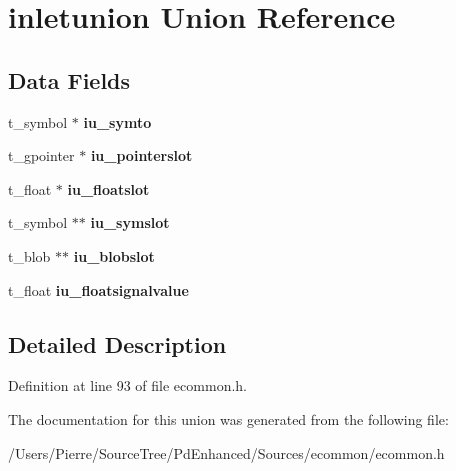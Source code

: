 \hypertarget{unioninletunion}{\section{inletunion Union Reference}
\label{unioninletunion}
}
\subsection*{Data Fields}
\begin{DoxyCompactItemize}
\item 
\hypertarget{unioninletunion_a034ef76c9ac47aad410c151b1a3072ed}{t\-\_\-symbol $\ast$ {\bfseries iu\-\_\-symto}}\label{unioninletunion_a034ef76c9ac47aad410c151b1a3072ed}

\item 
\hypertarget{unioninletunion_a765f6acce4359fbeaebd130279fdd899}{t\-\_\-gpointer $\ast$ {\bfseries iu\-\_\-pointerslot}}\label{unioninletunion_a765f6acce4359fbeaebd130279fdd899}

\item 
\hypertarget{unioninletunion_a4ea31644c26b1c46f9541353b293d3f6}{t\-\_\-float $\ast$ {\bfseries iu\-\_\-floatslot}}\label{unioninletunion_a4ea31644c26b1c46f9541353b293d3f6}

\item 
\hypertarget{unioninletunion_a347eb160d2e6d55719beabdae51a2ac9}{t\-\_\-symbol $\ast$$\ast$ {\bfseries iu\-\_\-symslot}}\label{unioninletunion_a347eb160d2e6d55719beabdae51a2ac9}

\item 
\hypertarget{unioninletunion_aa5bed621c07aa6838a05e81384933715}{t\-\_\-blob $\ast$$\ast$ {\bfseries iu\-\_\-blobslot}}\label{unioninletunion_aa5bed621c07aa6838a05e81384933715}

\item 
\hypertarget{unioninletunion_a4b62c62214438358765fee52d88ac7c5}{t\-\_\-float {\bfseries iu\-\_\-floatsignalvalue}}\label{unioninletunion_a4b62c62214438358765fee52d88ac7c5}

\end{DoxyCompactItemize}


\subsection{Detailed Description}


Definition at line 93 of file ecommon.\-h.



The documentation for this union was generated from the following file\-:\begin{DoxyCompactItemize}
\item 
/\-Users/\-Pierre/\-Source\-Tree/\-Pd\-Enhanced/\-Sources/ecommon/ecommon.\-h\end{DoxyCompactItemize}
